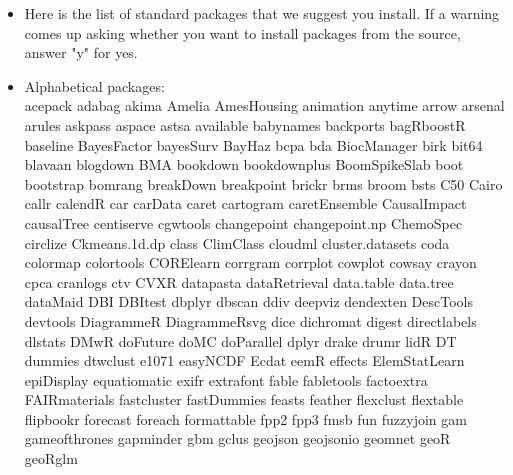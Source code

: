 \documentclass[10pt]{article} %
\begin{document}
    \begin{itemize}
      \item Here is the list of standard packages that we suggest you install.
      If a warning comes up asking whether you want to install packages from the source, answer "y" for yes. \\

      \item Alphabetical packages: \\
      acepack
      adabag
      akima
      Amelia
      AmesHousing
      animation
      anytime
      arrow
      arsenal
      arules
      askpass
      aspace
      astsa
      available
      babynames
      backports
      bagRboostR
      baseline
      BayesFactor
      bayesSurv
      BayHaz
      bcpa
      bda
      BiocManager
      birk
      bit64
      blavaan
      blogdown
      BMA
      bookdown
      bookdownplus
      BoomSpikeSlab
      boot
      bootstrap
      bomrang
      breakDown
      breakpoint
      brickr
      brms
      broom
      bsts
      C50
      Cairo
      callr
      calendR
      car
      carData
      caret
      cartogram
      caretEnsemble
      CausalImpact
      causalTree
      centiserve
      cgwtools
      changepoint
      changepoint.np
      ChemoSpec
      circlize
      Ckmeans.1d.dp
      class
      ClimClass
      cloudml
      cluster.datasets
      coda
      colormap
      colortools
      CORElearn
      corrgram
      corrplot
      cowplot
      cowsay
      crayon
      cpca
      cranlogs
      ctv
      CVXR
      datapasta
      dataRetrieval
      data.table
      data.tree
      dataMaid
      DBI
      DBItest
      dbplyr
      dbscan
      ddiv
      deepviz
      dendexten
      DescTools
      devtools
      DiagrammeR
      DiagrammeRsvg
      dice
      dichromat
      digest
      directlabels
      dlstats
      DMwR
      doFuture
      doMC
      doParallel
      dplyr
      drake
      drumr
      lidR
      DT
      dummies
      dtwclust
      e1071
      easyNCDF
      Ecdat
      eemR
      effects
      ElemStatLearn
      epiDisplay
      equatiomatic
      exifr
      extrafont
      fable
      fabletools
      factoextra
      FAIRmaterials
      fastcluster
      fastDummies
      feasts
      feather
      flexclust
      flextable
      flipbookr
      forecast
      foreach
      formattable
      fpp2
      fpp3
      fmsb
      fun
      fuzzyjoin
      gam
      gameofthrones
      gapminder
      gbm
      gclus
      geojson
      geojsonio
      geomnet
      geoR
      geoRglm

\end{itemize}
\end{document}
